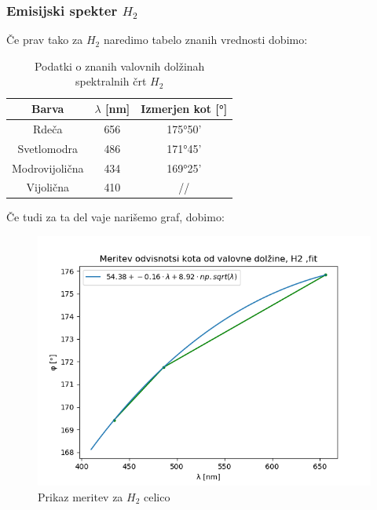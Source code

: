 \documentclass[11pt, a4paper]{article}
\theoremstyle{definition}
\theoremstyle{example}
\theoremstyle{izrek}
\begin{document}
\subsubsection{Emisijski spekter $H_2$}
Če prav tako za $H_2$ naredimo tabelo znanih vrednosti dobimo:
\begin{table}[H]
	\centering
	\begin{tabular}{|c|c|c|}
		\hline
		Barva &  $\lambda$ [nm] & Izmerjen kot [°] \\
		\hline
		\hline
		Rdeča  & 656 & 175°50' \\
		\hline
		Svetlomodra  & 486 & 171°45'\\
		\hline
		Modrovijolična & 434 & 169°25'\\
		\hline
		Vijolična & 410 & // \\  
		\hline
		\hline
	\end{tabular}
	\caption{Podatki o znanih valovnih dolžinah spektralnih črt $H_2$}	
\end{table}
Če tudi za ta del vaje narišemo graf, dobimo:
\begin{figure}[H]
    \centering
    \includegraphics[width=12cm]{H2 spekter,fit.png}
    \caption{Prikaz meritev za $H_2$ celico}
\end{figure}
\end{document}
